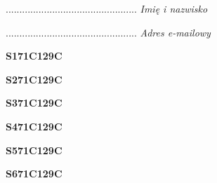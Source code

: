 \begin{turn}{90}\begin{minipage}{\linewidth} \vspace{20mm} ................................................  \textit{Imię i nazwisko}\end{minipage}\end{turn}

\begin{turn}{90}\begin{minipage}{\linewidth} \vspace{20mm} ................................................  \textit{Adres e-mailowy}\end{minipage}\end{turn}

\begin{turn}{90}\huge \begin{minipage}{\linewidth} \vspace{10mm}\textbf{S171C129C}\end{minipage}\end{turn}

\begin{turn}{90}\huge \begin{minipage}{\linewidth} \vspace{10mm}\textbf{S271C129C}\end{minipage}\end{turn}

\begin{turn}{90}\huge \begin{minipage}{\linewidth} \vspace{10mm}\textbf{S371C129C}\end{minipage}\end{turn}

\begin{turn}{90}\huge \begin{minipage}{\linewidth} \vspace{10mm}\textbf{S471C129C}\end{minipage}\end{turn}

\begin{turn}{90}\huge \begin{minipage}{\linewidth} \vspace{10mm}\textbf{S571C129C}\end{minipage}\end{turn}

\begin{turn}{90}\huge \begin{minipage}{\linewidth} \vspace{10mm}\textbf{S671C129C}\end{minipage}\end{turn}

